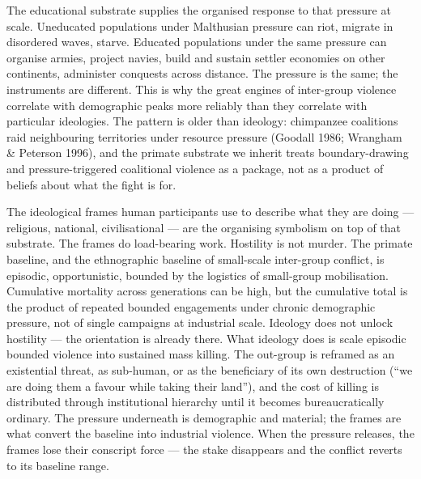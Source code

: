 \documentclass[12pt,letterpaper]{article}
\begin{document}
The educational substrate supplies the organised response to that
pressure at scale. Uneducated populations under Malthusian pressure can
riot, migrate in disordered waves, starve. Educated populations under
the same pressure can organise armies, project navies, build and
sustain settler economies on other continents, administer conquests
across distance. The pressure is the same; the instruments are
different. This is why the great engines of inter-group violence
correlate with demographic peaks more reliably than they correlate with
particular ideologies. The pattern is older than ideology: chimpanzee
coalitions raid neighbouring territories under resource pressure
(Goodall 1986; Wrangham \& Peterson 1996), and the primate
substrate we inherit treats boundary-drawing and pressure-triggered
coalitional violence as a package, not as a product of beliefs about
what the fight is for.

The ideological frames human
participants use to describe what they are doing --- religious,
national, civilisational --- are the organising symbolism on top of
that substrate. The frames do load-bearing work. Hostility is not
murder. The primate baseline, and the ethnographic baseline of
small-scale inter-group conflict, is episodic, opportunistic, bounded
by the logistics of small-group mobilisation. Cumulative mortality
across generations can be high, but the cumulative total is the
product of repeated bounded engagements under chronic demographic
pressure, not of single campaigns at industrial scale. Ideology does
not unlock hostility --- the orientation is already there. What
ideology does is scale episodic bounded violence into sustained mass
killing. The out-group is reframed as an existential
threat, as sub-human, or as the beneficiary of its own destruction
(``we are doing them a favour while taking their land''), and the cost
of killing is distributed through institutional hierarchy until it
becomes bureaucratically ordinary. The pressure underneath is
demographic and material; the frames are what convert the baseline into
industrial violence. When the pressure releases, the frames lose their
conscript force --- the stake disappears and the conflict reverts to
its baseline range.
\end{document}
